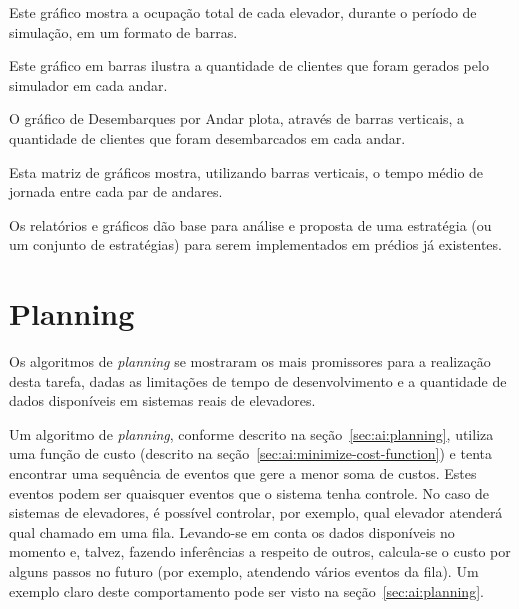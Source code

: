 \begin{description}[leftmargin=!,labelwidth=\widthof{\bfseries Tempo de Jornada por Andar}]
  \item[Clientes por Elevador]
    Este gráfico mostra a ocupação total de cada elevador, durante o período de
    simulação, em um formato de barras.
  \item[Chegadas por Andar]
    Este gráfico em barras ilustra a quantidade de clientes que foram gerados pelo
    simulador em cada andar.
  \item[Desembarques por Andar]
    O gráfico de Desembarques por Andar plota, através de barras verticais, a
    quantidade de clientes que foram desembarcados em cada andar.
  \item[Tempo de Jornada por Andar]
    Esta matriz de gráficos mostra, utilizando barras verticais, o tempo médio de
    jornada entre cada par de andares.
\end{description}

Os relatórios e gráficos dão base para análise e proposta de uma estratégia (ou
um conjunto de estratégias) para serem implementados em prédios já existentes.

\section{\label{sec:objectives:planning}Planning}


Os algoritmos de \textit{planning} se mostraram os mais promissores para a
realização desta tarefa, dadas as limitações de tempo de desenvolvimento e a
quantidade de dados disponíveis em sistemas reais de elevadores.

Um algoritmo de \textit{planning}, conforme descrito na
seção~\ref{sec:ai:planning}, utiliza uma função de custo (descrito na
seção~\ref{sec:ai:minimize-cost-function}) e tenta encontrar uma sequência de
eventos que gere a menor soma de custos. Estes eventos podem ser quaisquer
eventos que o sistema tenha controle. No caso de sistemas de elevadores, é
possível controlar, por exemplo, qual elevador atenderá qual chamado em uma
fila. Levando-se em conta os dados disponíveis no momento e, talvez, fazendo
inferências a respeito de outros, calcula-se o custo por alguns passos no futuro
(por exemplo, atendendo vários eventos da fila). Um exemplo claro deste
comportamento pode ser visto na seção~\ref{sec:ai:planning}.

